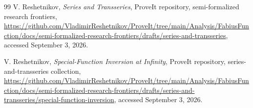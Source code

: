 \documentclass[11pt,a4paper,oneside]{book}
\begin{document}
\begin{thebibliography}{99}
V. Reshetnikov,
\emph{Series and Transseries},
ProveIt repository, semi-formalized research frontiers,
\url{https://github.com/VladimirReshetnikov/ProveIt/tree/main/Analysis/FabiusFunction/docs/semi-formalized-research-frontiers/drafts/series-and-transseries},
accessed September 3, 2026.

V. Reshetnikov,
\emph{Special-Function Inversion at Infinity},
ProveIt repository, series-and-transseries collection,
\url{https://github.com/VladimirReshetnikov/ProveIt/tree/main/Analysis/FabiusFunction/docs/semi-formalized-research-frontiers/drafts/series-and-transseries/special-function-inversion},
accessed September 3, 2026.

\end{thebibliography}
\end{document}
